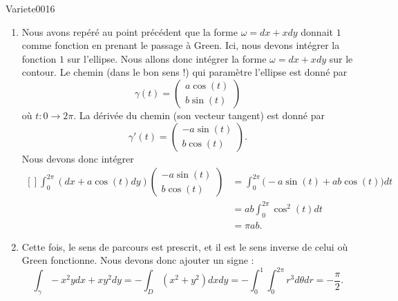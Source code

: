 \begin{corrige}{Variete0016}
\begin{enumerate}
		\item
			Nous avons repéré au point précédent que la forme $\omega =dx+xdy$ donnait $1$ comme fonction en prenant le passage à Green. Ici, nous devons intégrer la fonction $1$ sur l'ellipse. Nous allons donc intégrer la forme $\omega=dx+xdy$ sur le contour. Le chemin (dans le bon sens !) qui paramètre l'ellipse est donné par
			\begin{equation}
				\gamma(t)=\begin{pmatrix}
					a\cos(t)	\\ 
					b\sin(t)	
				\end{pmatrix}
			\end{equation}
			où $t\colon 0\to 2\pi$. La dérivée du chemin (son vecteur tangent) est donné par
			\begin{equation}
				\gamma'(t)=\begin{pmatrix}
					-a\sin(t)	\\ 
					b\cos(t)	
				\end{pmatrix}.
			\end{equation}
			Nous devons donc intégrer
			\begin{equation}
				\begin{aligned}[]
					\int_0^{2\pi}(dx+a\cos(t)dy)\begin{pmatrix}
						-a\sin(t)	\\ 
						b\cos(t)	
					\end{pmatrix}
					&=\int_0^{2\pi}\big( -a\sin(t)+ab\cos(t) \big)dt\\
					&=ab\int_0^{2\pi}\cos^2(t)dt\\
					&=\pi ab.
				\end{aligned}
			\end{equation}

		\item
			Cette fois, le sens de parcours est prescrit, et il est le sens inverse de celui où Green fonctionne. Nous devons donc ajouter un signe :
			\begin{equation}
				\int_{\gamma}-x^2ydx+xy^2dy=-\int_D(x^2+y^2)dxdy=-\int_0^1\int_0^{2\pi}r^3d\theta dr=-\frac{ \pi }{ 2 }.
			\end{equation}
			

	\end{enumerate}
\end{corrige}
